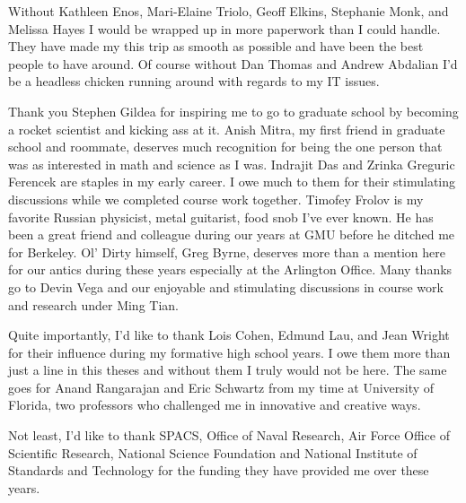 Without Kathleen Enos, Mari-Elaine Triolo, Geoff Elkins, Stephanie Monk, and Melissa Hayes I would be wrapped up in more paperwork than I could handle. They have made my this trip as smooth as possible and have been the best people to have around.
Of course without Dan Thomas and Andrew Abdalian I'd be a headless chicken running around with regards to my IT issues.


Thank you Stephen Gildea for inspiring me to go to graduate school by becoming a rocket scientist and kicking ass at it.
Anish Mitra, my first friend in graduate school and roommate, deserves much recognition for being the one person that was as interested in math and science as I was. 
Indrajit Das and Zrinka Greguric Ferencek are staples in my early career. I owe much to them for their stimulating discussions while we completed course work together. 
Timofey Frolov is my favorite Russian physicist, metal guitarist, food snob I've ever known. He has been a great friend and colleague during our years at GMU before he ditched me for Berkeley. 
Ol' Dirty himself, Greg Byrne, deserves more than a mention here for our antics during these years especially at the Arlington Office.
Many thanks go to Devin Vega and our enjoyable and stimulating discussions in course work and research under Ming Tian.

Quite importantly, I'd like to thank Lois Cohen, Edmund Lau, and Jean Wright for their influence during my formative high school years.  I owe them more than just a line in this theses and without them I truly would not be here. The same goes for Anand Rangarajan and Eric Schwartz from my time at University of Florida, two professors who challenged me in innovative and creative ways.

Not least, I'd like to thank SPACS, Office of Naval Research, Air Force Office of Scientific Research, National Science Foundation and National Institute of Standards and Technology for the funding they have provided me over these years.